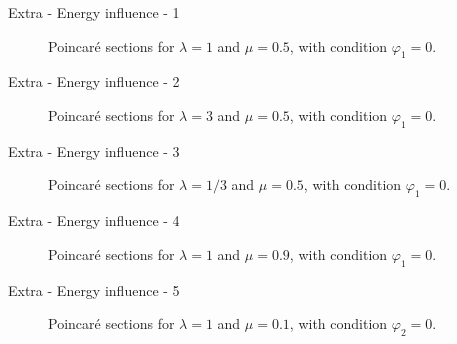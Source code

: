 \documentclass{beamer}
\begin{document}
\begin{frame}{Extra - Energy influence - 1}
\begin{figure}
    \centering
    
    \caption{Poincaré sections for $\lambda=1$ and $\mu=0.5$, with condition $\varphi_1=0$.}
\end{figure}
\end{frame}

\begin{frame}{Extra - Energy influence - 2}
\begin{figure}
    \centering
    
    \caption{Poincaré sections for $\lambda=3$ and $\mu=0.5$, with condition $\varphi_1=0$.}
\end{figure}
\end{frame}

\begin{frame}{Extra - Energy influence - 3}
\begin{figure}
    \centering
    
    \caption{Poincaré sections for $\lambda=1/3$ and $\mu=0.5$, with condition $\varphi_1=0$.}
\end{figure}
\end{frame}

\begin{frame}{Extra - Energy influence - 4}
\begin{figure}
    \centering
    
    \caption{Poincaré sections for $\lambda=1$ and $\mu=0.9$, with condition $\varphi_1=0$.}
\end{figure}
\end{frame}

\begin{frame}{Extra - Energy influence - 5}
\begin{figure}
    \centering
    
    \caption{Poincaré sections for $\lambda=1$ and $\mu=0.1$, with condition $\varphi_2=0$.}
\end{figure}
\end{frame}
\end{document}
